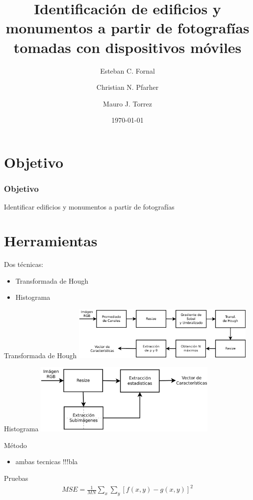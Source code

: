 \documentclass[spanish]{beamer}
\title{Identificación de edificios y monumentos a partir de fotografías tomadas 
con dispositivos móviles}
\author{Esteban C. Fornal \and Christian N. Pfarher \and Mauro J. Torrez}
\date{\today}
\begin{document}
%
\frame{\titlepage}

\section[Outline]{Objetivo}

\begin{frame}{}
\frametitle{Objetivo}
Identificar edificios y monumentos a partir de fotografías
\end{frame}

\section[Outline]{Herramientas}
\begin{frame}{Dos técnicas:}
\begin{itemize}
\item<1-> Transformada de Hough
\item<2-> Histograma
\end{itemize}
\end{frame}

\begin{frame}{Transformada de Hough}
  \includegraphics[width=9cm]{../diagramas/procesohough}
\end{frame}


\begin{frame}{Histograma}
  \includegraphics[width=9cm]{../diagramas/procesoestadisticas}
\end{frame}


\begin{frame}{Método}
  \begin{itemize}
  \item ambas tecnicas !!!bla
  \end{itemize}
\end{frame}

\begin{frame}{Pruebas}
  \begin{align*}
    MSE = \frac{1}{MN} \sum_x\sum_y [ f(x,y) - g(x,y) ]^{2}
  \end{align*}
\end{frame}
\end{document}
